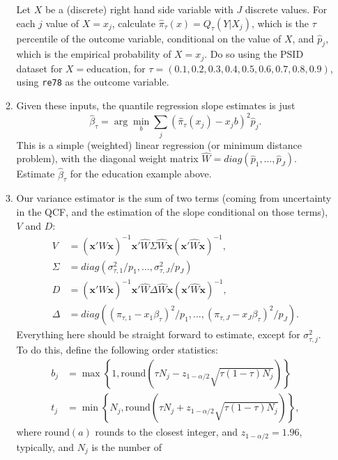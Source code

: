 \documentclass[11pt, a4paper]{article}
\begin{document}
\begin{enumerate}
\begin{enumerate}
    Let $X$ be a (discrete) right hand side variable with $J$ discrete
    values.  For each $j$ value of $X = x_{j}$, calculate
    $\hat{\pi}_{\tau}(x) = Q_{\tau}(Y|X_{j})$, which is the $\tau$
    percentile of the outcome variable, conditional on the value of
    $X$, and $\hat{p}_{j}$, which is the empirical probability of
    $X = x_{j}$.  Do so using the PSID dataset for
    $X = \textrm{education}$, for
    $\tau = (0.1,0.2,0.3,0.4,0.5,0.6,0.7,0.8,0.9)$, using
    \texttt{re78} as the outcome variable.
  \item Given these inputs, the quantile regression slope
    estimates is just
    $$ \hat{\beta}_{\tau} = \arg\min_{b} \sum_{j} (\hat{\pi}_{\tau}(x_{j}) - x_{j}b)^{2}\hat{p}_{j}.$$
    This is a simple (weighted) linear regression (or minimum distance
    problem), with the diagonal weight matrix
    $\hat{W} = diag(\hat{p}_{1}, \ldots, \hat{p}_{J})$. Estimate
    $\hat{\beta}_{\tau}$ for the education example above.
  \item Our variance estimator is the sum of two terms (coming from
    uncertainty in the QCF, and the estimation of the slope
    conditional on those terms), $V$ and $D$:
    \begin{align*}
  V &= \left(\boldsymbol{x}'\hat{W}\boldsymbol{x}\right)^{-1}\boldsymbol{x}'\hat{W}\Sigma\hat{W}\boldsymbol{x}\left(\boldsymbol{x}'\hat{W}\boldsymbol{x}\right)^{-1},\\
  \Sigma &= diag(\sigma^{2}_{\tau,1}/p_{1}, \ldots, \sigma^{2}_{\tau,J}/p_{J})\\
  D &= \left(\boldsymbol{x}'\hat{W}\boldsymbol{x}\right)^{-1}\boldsymbol{x}'\hat{W}\Delta\hat{W}\boldsymbol{x}\left(\boldsymbol{x}'\hat{W}\boldsymbol{x}\right)^{-1},\\
  \Delta &= diag((\pi_{\tau,1} - x_{1}\beta_{\tau})^{2}/p_{1}, \ldots, (\pi_{\tau,J} - x_{J}\beta_{\tau})^{2}/p_{J}).
\end{align*}
Everything here should be straight forward to estimate, except for
$\sigma^{2}_{\tau,j}$. To do this, define the following order
statistics:
\begin{align*}
  b_{j} &= \max \left\{1, \mathrm{round}\left(\tau N_{j} - z_{1-\alpha/2}\sqrt{\tau(1-\tau)N_{j}}\right)\right\}\\
  t_{j} &= \min \left\{N_{j}, \mathrm{round}\left(\tau N_{j} + z_{1-\alpha/2}\sqrt{\tau(1-\tau)N_{j}}\right)\right\},
\end{align*}
where $\mathrm{round}(a)$ rounds to the closest integer, and
$z_{1-\alpha/2} = 1.96$, typically, and $N_{j}$ is the number of

\end{enumerate}
\end{enumerate}
\end{document}
